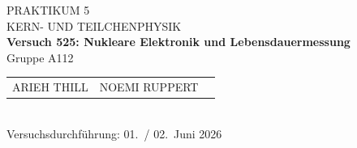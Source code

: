 \documentclass[%
paper=a4,       %
fontsize=11pt,  %
ngerman         %
]{scrreprt}
\begin{document}
\begin{titlepage}
  \centering
  \vspace*{2cm}
  
  {\Large PRAKTIKUM 5}\\[0.5cm]
  {\large KERN- UND TEILCHENPHYSIK }\\[1cm]
  
  {\LARGE\bfseries Versuch 525: Nukleare Elektronik und Lebensdauermessung}\\[1cm]
  
  Gruppe A112\\[1cm]
  
  \begin{tabular}{lll}
    ARIEH THILL & NOEMI RUPPERT  \\
  \end{tabular}\\[2cm]
  
  Versuchsdurchführung: 01.~/ 02.~Juni 2026
  
  \vfill
\end{titlepage}

\tableofcontents
\clearpage
\clearpage
\setcounter{page}{1}
 
 



\appendix
\printbibliography{}
%
\end{document}
